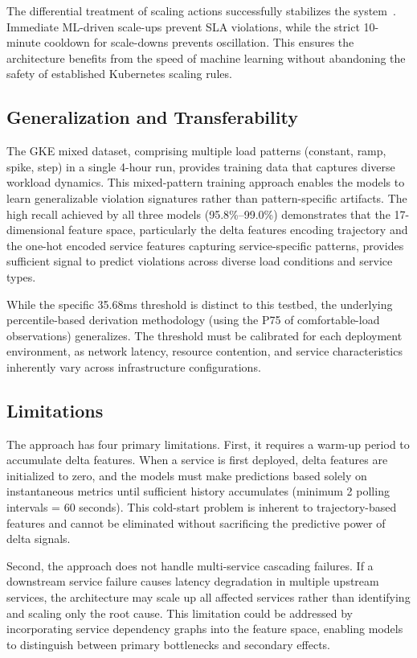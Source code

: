 \documentclass[conference]{IEEEtran}
\begin{document}
The differential treatment of scaling actions successfully stabilizes the system~\cite{lorido2014autoscaling,autopilot}. Immediate ML-driven scale-ups prevent SLA violations, while the strict 10-minute cooldown for scale-downs prevents oscillation. This ensures the architecture benefits from the speed of machine learning without abandoning the safety of established Kubernetes scaling rules.

\subsection{Generalization and Transferability}

The GKE mixed dataset, comprising multiple load patterns (constant, ramp, spike, step) in a single 4-hour run, provides training data that captures diverse workload dynamics. This mixed-pattern training approach enables the models to learn generalizable violation signatures rather than pattern-specific artifacts. The high recall achieved by all three models (95.8\%--99.0\%) demonstrates that the 17-dimensional feature space, particularly the delta features encoding trajectory and the one-hot encoded service features capturing service-specific patterns, provides sufficient signal to predict violations across diverse load conditions and service types.

While the specific 35.68ms threshold is distinct to this testbed, the underlying percentile-based derivation methodology (using the P75 of comfortable-load observations) generalizes. The threshold must be calibrated for each deployment environment, as network latency, resource contention, and service characteristics inherently vary across infrastructure configurations.

\subsection{Limitations}

The approach has four primary limitations. First, it requires a warm-up period to accumulate delta features. When a service is first deployed, delta features are initialized to zero, and the models must make predictions based solely on instantaneous metrics until sufficient history accumulates (minimum 2 polling intervals = 60 seconds). This cold-start problem is inherent to trajectory-based features and cannot be eliminated without sacrificing the predictive power of delta signals.

Second, the approach does not handle multi-service cascading failures. If a downstream service failure causes latency degradation in multiple upstream services, the architecture may scale up all affected services rather than identifying and scaling only the root cause. This limitation could be addressed by incorporating service dependency graphs into the feature space, enabling models to distinguish between primary bottlenecks and secondary effects.
\end{document}
